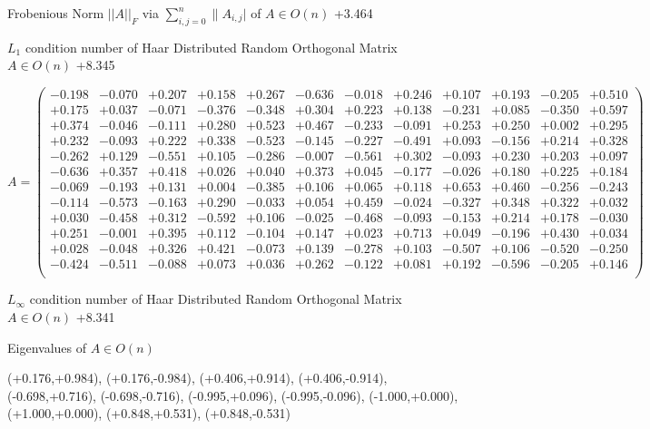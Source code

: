 \documentclass[9pt]{article}
\theoremstyle{plain}
\theoremstyle{definition}
\theoremstyle{remark}
\numberwithin{equation}{section}
\begin{document}
Frobenious Norm  $||A||_{\textit{F}}$ via $\sum\limits_{i,j =0}^{n} \|A_{i,j}|$   of  $A \in O(n)$  +3.464

$L_1$ condition number of Haar Distributed Random Orthogonal Matrix $A \in O(n)$ +8.345

$A = \left(
\begin{array}{
cccccccccccc}
-0.198 & -0.070 & +0.207 & +0.158 & +0.267 & -0.636 & -0.018 & +0.246 & +0.107 & +0.193 & -0.205 & +0.510 \\
+0.175 & +0.037 & -0.071 & -0.376 & -0.348 & +0.304 & +0.223 & +0.138 & -0.231 & +0.085 & -0.350 & +0.597 \\
+0.374 & -0.046 & -0.111 & +0.280 & +0.523 & +0.467 & -0.233 & -0.091 & +0.253 & +0.250 & +0.002 & +0.295 \\
+0.232 & -0.093 & +0.222 & +0.338 & -0.523 & -0.145 & -0.227 & -0.491 & +0.093 & -0.156 & +0.214 & +0.328 \\
-0.262 & +0.129 & -0.551 & +0.105 & -0.286 & -0.007 & -0.561 & +0.302 & -0.093 & +0.230 & +0.203 & +0.097 \\
-0.636 & +0.357 & +0.418 & +0.026 & +0.040 & +0.373 & +0.045 & -0.177 & -0.026 & +0.180 & +0.225 & +0.184 \\
-0.069 & -0.193 & +0.131 & +0.004 & -0.385 & +0.106 & +0.065 & +0.118 & +0.653 & +0.460 & -0.256 & -0.243 \\
-0.114 & -0.573 & -0.163 & +0.290 & -0.033 & +0.054 & +0.459 & -0.024 & -0.327 & +0.348 & +0.322 & +0.032 \\
+0.030 & -0.458 & +0.312 & -0.592 & +0.106 & -0.025 & -0.468 & -0.093 & -0.153 & +0.214 & +0.178 & -0.030 \\
+0.251 & -0.001 & +0.395 & +0.112 & -0.104 & +0.147 & +0.023 & +0.713 & +0.049 & -0.196 & +0.430 & +0.034 \\
+0.028 & -0.048 & +0.326 & +0.421 & -0.073 & +0.139 & -0.278 & +0.103 & -0.507 & +0.106 & -0.520 & -0.250 \\
-0.424 & -0.511 & -0.088 & +0.073 & +0.036 & +0.262 & -0.122 & +0.081 & +0.192 & -0.596 & -0.205 & +0.146 \\
\end{array}
\right)$ \newline 

$L_{\infty}$ condition number of Haar Distributed Random Orthogonal Matrix $A \in O(n)$ +8.341

Eigenvalues of $A \in O(n)$

(+0.176,+0.984), (+0.176,-0.984), (+0.406,+0.914), (+0.406,-0.914), (-0.698,+0.716), (-0.698,-0.716), (-0.995,+0.096), (-0.995,-0.096), (-1.000,+0.000), (+1.000,+0.000), (+0.848,+0.531), (+0.848,-0.531)
\end{document}
